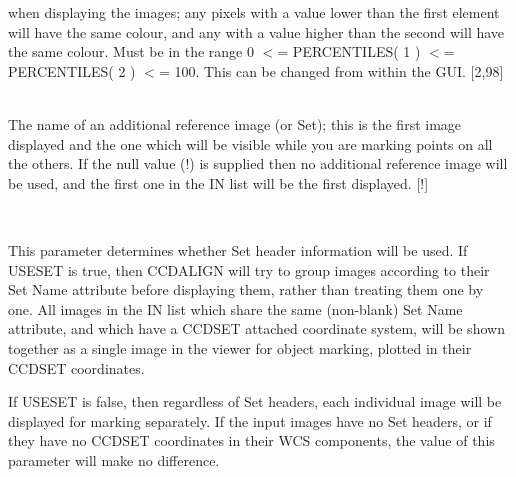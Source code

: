 \documentclass[twoside,11pt]{article}
\renewcommand{\_}{\texttt{\symbol{95}}}
\newcommand{\routine}[1]{{\sc #1}}
\newcommand{\sstsubsection}[1]{ \item[{#1}] \mbox{} \\}
\newcommand{\sstsubsection}[1]{\item[{#1}]}
\begin{document}
{{{         when displaying the images; any pixels with a value lower than
         the first element will have the same colour, and any with a value
         higher than the second will have the same colour.  Must be in
         the range 0 $<$= PERCENTILES( 1 ) $<$= PERCENTILES( 2 ) $<$= 100.
         This can be changed from within the GUI.
         [2,98]
      }
      \sstsubsection{
         REFNDF = LITERAL (Read)
      }{
         The name of an additional reference image (or Set); this is the
         first image displayed and the one which will be visible while
         you are marking points on all the others.  If the null value
         (!) is supplied then no additional reference image will be
         used, and the first one in the IN list will be the first
         displayed.
         [!]
      }
      \sstsubsection{
         USESET = \_LOGICAL (Read)
      }{
         This parameter determines whether Set header information will
         be used.  If USESET is true, then \routine{CCDALIGN} will try to
         group images according to their Set Name attribute before
         displaying them, rather than treating them one by one.
         All images in the IN list which share the same (non-blank)
         Set Name attribute, and which have a CCD\_SET attached
         coordinate system, will be shown together as a single
         image in the viewer for object marking, plotted in their
         CCD\_SET coordinates.

         If USESET is false, then regardless of Set headers, each
         individual image will be displayed for marking separately.
         If the input images have no Set headers, or if they have
         no CCD\_SET coordinates in their WCS components, the value
         of this parameter will make no difference.

}}}
\end{document}
